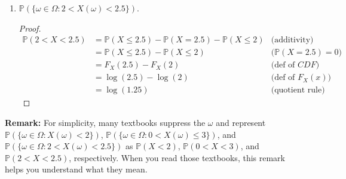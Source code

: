 \documentclass[11pt]{article}
\newcommand{\p}{\mathbb{P}}
\begin{document}
\begin{enumerate}
\begin{enumerate}
\begin{proof}
\begin{align*}
            &= 1 - 0 & \text{(def of \(F_X(x)\))}\\
            &= 1 & \text{(subtraction)}
        \end{align*}
    \end{proof}
    \item $\mathbb{P}(\{\omega\in\Omega: 2<X(\omega)<2.5\})$.
    \begin{proof}
        \begin{align*}
            \p(2<X<2.5) &= \p(X\leq 2.5) - \p(X=2.5) - \p(X\leq 2) & \text{(additivity)}\\
            &= \p(X\leq 2.5) - \p(X\leq 2) & \text{(\(\p(X=2.5)=0\))}\\
            &= F_X(2.5) - F_X(2) & \text{(def of \(CDF\))}\\
            &= \log(2.5) - \log(2) & \text{(def of \(F_X(x)\))}\\
            &= \log(1.25) & \text{(quotient rule)}
        \end{align*}
    \end{proof}
\end{enumerate}
\textbf{Remark:} For simplicity, many textbooks suppress the $\omega$ and represent  $\mathbb{P}(\{\omega\in\Omega: X(\omega)<2\})$, $\mathbb{P}(\{\omega\in\Omega: 0<X(\omega)\le3\})$, and $\mathbb{P}(\{\omega\in\Omega: 2<X(\omega)<2.5\})$ as $\mathbb{P}(X<2)$, $\mathbb{P}(0<X<3)$, and $\mathbb{P}(2<X<2.5)$, respectively. When you read those textbooks, this remark helps you understand what they mean.

\end{enumerate}


\newpage
\end{document}
